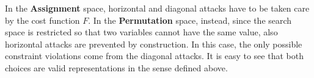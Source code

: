 \begin{figure}
  \subfigures 
  \begin{minipage}{\textwidth}
    \hspace{\fill}
  \end{minipage}
\end{figure}

In the \textbf{Assignment} space, horizontal and diagonal attacks have
to be taken care by the cost function $F$. In the \textbf{Permutation}
space, instead, since the search space is restricted so that two variables
cannot have the same value, also horizontal attacks are prevented by construction. In
this case, the only possible constraint violations come from the
diagonal attacks. It is easy to see that both choices are valid representations in the
sense defined above.

